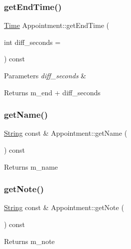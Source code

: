 \subsubsection{\texorpdfstring{get\+End\+Time()}{getEndTime()}}
{\footnotesize\ttfamily \hyperlink{classTime}{Time} Appointment\+::get\+End\+Time (\begin{DoxyParamCaption}\item[{int}]{diff\+\_\+seconds = {} }\end{DoxyParamCaption}) const}


\begin{DoxyParams}{Parameters}
{\em diff\+\_\+seconds} & \\
\hline
\end{DoxyParams}
\begin{DoxyReturn}{Returns}
m\+\_\+end + diff\+\_\+seconds 
\end{DoxyReturn}
\mbox{\label{classAppointment_ab2cbd469ff67c37c34a91c02a1ba9d35}} 
\subsubsection{\texorpdfstring{get\+Name()}{getName()}}
{\footnotesize\ttfamily \hyperlink{classString}{String} const  \& Appointment\+::get\+Name (\begin{DoxyParamCaption}{ }\end{DoxyParamCaption}) const}

\begin{DoxyReturn}{Returns}
m\+\_\+name 
\end{DoxyReturn}
\mbox{\label{classAppointment_aaf6078fe8f092e321a38d173bc7093c3}} 
\subsubsection{\texorpdfstring{get\+Note()}{getNote()}}
{\footnotesize\ttfamily \hyperlink{classString}{String} const  \& Appointment\+::get\+Note (\begin{DoxyParamCaption}{ }\end{DoxyParamCaption}) const}

\begin{DoxyReturn}{Returns}
m\+\_\+note 
\end{DoxyReturn}
\mbox{\label{classAppointment_a577870c4d05eb584d58c61c98b9b65a0}} 
